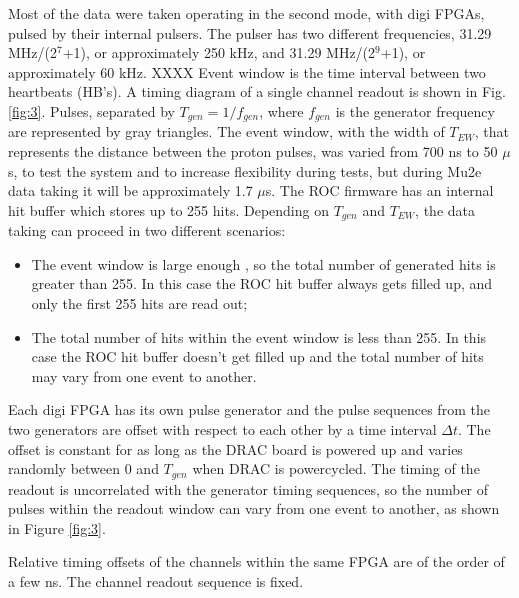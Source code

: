     Most of the data were taken operating in the second mode, with digi FPGAs, pulsed by their internal pulsers.
    The pulser has two different frequencies,  31.29 MHz/(2$^7$+1), or approximately 250 kHz, 
    and 31.29 MHz/(2$^9$+1), or approximately 60 kHz. XXXX
    Event window is the time interval between two heartbeats (HB's). 
    A timing diagram of a single channel readout is shown in Fig. \ref{fig:3}.
    Pulses, separated by $T_{gen}=1/f_{gen}$, where $f_{gen}$ is the generator frequency
    are represented by gray triangles.
    The event window, with the width of $T_{EW}$, that represents the distance between the proton pulses, 
    was varied from 700 ns to 50 $\mu$s, to test the system and to increase flexibility during tests, but during Mu2e data taking it will be approximately 1.7 $\mu$s. 
    The ROC firmware has an internal hit buffer which stores up to 255 hits.
    Depending on $T_{gen}$ and $T_{EW}$, the data taking can proceed in two different
    scenarios:
    \begin{itemize}
    \item
      The event window is large enough , so the total number of generated hits is greater than 255. In this case
      the ROC hit buffer always gets filled up, and only the first 255 hits are read out;
    \item
      The total number of hits within the event window is less than 255.
      In this case the ROC hit buffer doesn't get filled up and the total number of hits may vary from one event to another.
    \end{itemize}
    
    Each digi FPGA has its own pulse generator and the pulse sequences from the two
    generators are offset with respect to each other by a time interval $\Delta t$.
    The offset is constant for as long as the DRAC board is powered up and varies randomly between 0 and $T_{gen}$ when DRAC is powercycled.
    The timing of the readout is uncorrelated with the generator timing sequences,
      so the number of pulses within the readout window can vary from one event to another, as shown
      in Figure \ref{fig:3}.
    
    Relative timing offsets of the channels within the same FPGA are of the order of a few ns.
    The channel readout sequence is fixed.
    
